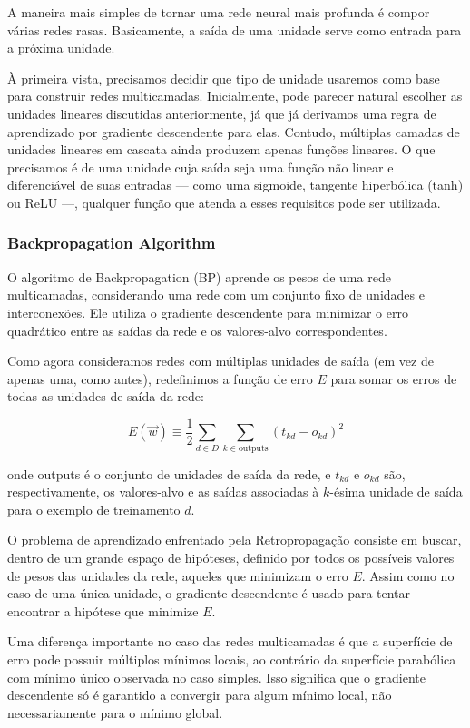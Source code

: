 \documentclass{article}
\begin{document}
A maneira mais simples de tornar uma rede neural mais profunda é compor várias redes rasas. Basicamente, a saída de uma unidade serve como entrada para a próxima unidade.

À primeira vista, precisamos decidir que tipo de unidade usaremos como base para construir redes multicamadas. Inicialmente, pode parecer natural escolher as unidades lineares discutidas anteriormente, já que já derivamos uma regra de aprendizado por gradiente descendente para elas.
Contudo, múltiplas camadas de unidades lineares em cascata ainda produzem apenas funções lineares.
O que precisamos é de uma unidade cuja saída seja uma função não linear e diferenciável de suas entradas — como uma sigmoide, tangente hiperbólica (tanh) ou ReLU —, qualquer função que atenda a esses requisitos pode ser utilizada.


\subsubsection{Backpropagation Algorithm }
O algoritmo de Backpropagation (BP) aprende os pesos de uma rede multicamadas, considerando uma rede com um conjunto fixo de unidades e interconexões.
Ele utiliza o gradiente descendente para minimizar o erro quadrático entre as saídas da rede e os valores-alvo correspondentes.

Como agora consideramos redes com múltiplas unidades de saída (em vez de apenas uma, como antes), redefinimos a função de erro $E$ para somar os erros de todas as unidades de saída da rede:

\begin{equation}
E(\Vec{w}) \equiv \frac{1}{2} \sum_{d \in D} \sum_{k \in \text{outputs}} (t_{kd} - o_{kd})^2
\end{equation}

onde outputs é o conjunto de unidades de saída da rede, e $t_{kd}$ e $o_{kd}$ são, respectivamente, os valores-alvo e as saídas associadas à $k$-ésima unidade de saída para o exemplo de treinamento $d$.

O problema de aprendizado enfrentado pela Retropropagação consiste em buscar, dentro de um grande espaço de hipóteses, definido por todos os possíveis valores de pesos das unidades da rede, aqueles que minimizam o erro $E$.
Assim como no caso de uma única unidade, o gradiente descendente é usado para tentar encontrar a hipótese que minimize $E$.

Uma diferença importante no caso das redes multicamadas é que a superfície de erro pode possuir múltiplos mínimos locais, ao contrário da superfície parabólica com mínimo único observada no caso simples.
Isso significa que o gradiente descendente só é garantido a convergir para algum mínimo local, não necessariamente para o mínimo global.
\end{document}
